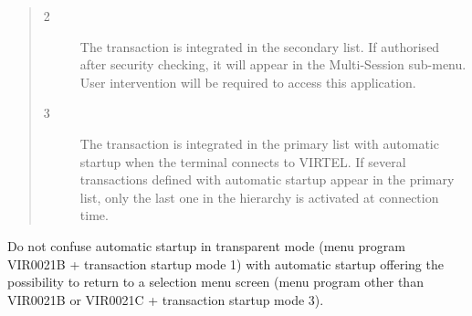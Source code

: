 \documentclass[letterpaper,10pt,english]{sphinxmanual}
\begin{document}
\begin{description}
\begin{quote}
\begin{description}
\item[{2}] \leavevmode
The transaction is integrated in the secondary list. If authorised after security checking, it will appear in the Multi-Session sub-menu. User intervention will be required to access this application.

\item[{3}] \leavevmode
The transaction is integrated in the primary list with automatic startup when the terminal connects to VIRTEL. If several transactions defined with automatic startup appear in the primary list, only the last one in the hierarchy is activated at connection time.

\end{description}
\end{quote}

Do not confuse automatic startup in transparent mode (menu program VIR0021B + transaction startup mode 1) with automatic startup offering the possibility to return to a selection menu screen (menu program other than VIR0021B or VIR0021C + transaction startup mode 3).

\end{description}
\end{document}
